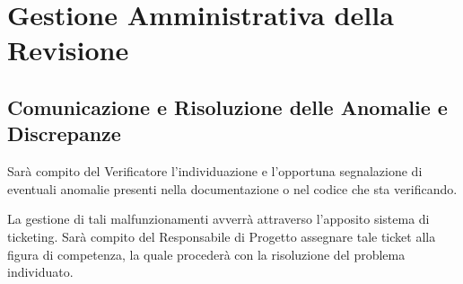 \section{Gestione Amministrativa della Revisione}

\subsection{Comunicazione e Risoluzione delle Anomalie e Discrepanze}
Sarà compito del Verificatore l’individuazione e l’opportuna segnalazione di eventuali anomalie presenti nella documentazione o nel codice che sta verificando.

La gestione di tali malfunzionamenti avverrà attraverso l’apposito sistema di ticketing. Sarà compito del Responsabile di Progetto assegnare tale ticket alla figura di competenza, la quale procederà con la risoluzione del problema individuato.
